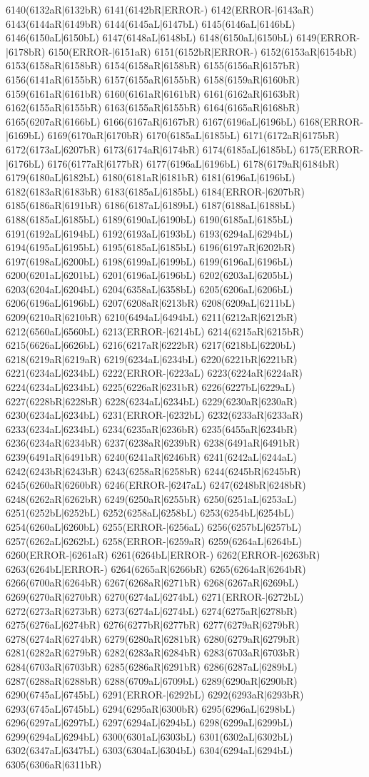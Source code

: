 6140(6132aR|6132bR) 6141(6142bR|ERROR-) 6142(ERROR-|6143aR) 6143(6144aR|6149bR) 6144(6145aL|6147bL) 6145(6146aL|6146bL) 6146(6150aL|6150bL) 6147(6148aL|6148bL) 6148(6150aL|6150bL) 6149(ERROR-|6178bR) 6150(ERROR-|6151aR) 6151(6152bR|ERROR-) 6152(6153aR|6154bR) 6153(6158aR|6158bR) 6154(6158aR|6158bR) 6155(6156aR|6157bR) 6156(6141aR|6155bR) 6157(6155aR|6155bR) 6158(6159aR|6160bR) 6159(6161aR|6161bR) 6160(6161aR|6161bR) 6161(6162aR|6163bR) 6162(6155aR|6155bR) 6163(6155aR|6155bR) 6164(6165aR|6168bR) 6165(6207aR|6166bL) 6166(6167aR|6167bR) 6167(6196aL|6196bL) 6168(ERROR-|6169bL) 6169(6170aR|6170bR) 6170(6185aL|6185bL) 6171(6172aR|6175bR) 6172(6173aL|6207bR) 6173(6174aR|6174bR) 6174(6185aL|6185bL) 6175(ERROR-|6176bL) 6176(6177aR|6177bR) 6177(6196aL|6196bL) 6178(6179aR|6184bR) 6179(6180aL|6182bL) 6180(6181aR|6181bR) 6181(6196aL|6196bL) 6182(6183aR|6183bR) 6183(6185aL|6185bL) 6184(ERROR-|6207bR) 6185(6186aR|6191bR) 6186(6187aL|6189bL) 6187(6188aL|6188bL) 6188(6185aL|6185bL) 6189(6190aL|6190bL) 6190(6185aL|6185bL) 6191(6192aL|6194bL) 6192(6193aL|6193bL) 6193(6294aL|6294bL) 6194(6195aL|6195bL) 6195(6185aL|6185bL) 6196(6197aR|6202bR) 6197(6198aL|6200bL) 6198(6199aL|6199bL) 6199(6196aL|6196bL) 6200(6201aL|6201bL) 6201(6196aL|6196bL) 6202(6203aL|6205bL) 6203(6204aL|6204bL) 6204(6358aL|6358bL) 6205(6206aL|6206bL) 6206(6196aL|6196bL) 6207(6208aR|6213bR) 6208(6209aL|6211bL) 6209(6210aR|6210bR) 6210(6494aL|6494bL) 6211(6212aR|6212bR) 6212(6560aL|6560bL) 6213(ERROR-|6214bL) 6214(6215aR|6215bR) 6215(6626aL|6626bL) 6216(6217aR|6222bR) 6217(6218bL|6220bL) 6218(6219aR|6219aR) 6219(6234aL|6234bL) 6220(6221bR|6221bR) 6221(6234aL|6234bL) 6222(ERROR-|6223aL) 6223(6224aR|6224aR) 6224(6234aL|6234bL) 6225(6226aR|6231bR) 6226(6227bL|6229aL) 6227(6228bR|6228bR) 6228(6234aL|6234bL) 6229(6230aR|6230aR) 6230(6234aL|6234bL) 6231(ERROR-|6232bL) 6232(6233aR|6233aR) 6233(6234aL|6234bL) 6234(6235aR|6236bR) 6235(6455aR|6234bR) 6236(6234aR|6234bR) 6237(6238aR|6239bR) 6238(6491aR|6491bR) 6239(6491aR|6491bR) 6240(6241aR|6246bR) 6241(6242aL|6244aL) 6242(6243bR|6243bR) 6243(6258aR|6258bR) 6244(6245bR|6245bR) 6245(6260aR|6260bR) 6246(ERROR-|6247aL) 6247(6248bR|6248bR) 6248(6262aR|6262bR) 6249(6250aR|6255bR) 6250(6251aL|6253aL) 6251(6252bL|6252bL) 6252(6258aL|6258bL) 6253(6254bL|6254bL) 6254(6260aL|6260bL) 6255(ERROR-|6256aL) 6256(6257bL|6257bL) 6257(6262aL|6262bL) 6258(ERROR-|6259aR) 6259(6264aL|6264bL) 6260(ERROR-|6261aR) 6261(6264bL|ERROR-) 6262(ERROR-|6263bR) 6263(6264bL|ERROR-) 6264(6265aR|6266bR) 6265(6264aR|6264bR) 6266(6700aR|6264bR) 6267(6268aR|6271bR) 6268(6267aR|6269bL) 6269(6270aR|6270bR) 6270(6274aL|6274bL) 6271(ERROR-|6272bL) 6272(6273aR|6273bR) 6273(6274aL|6274bL) 6274(6275aR|6278bR) 6275(6276aL|6274bR) 6276(6277bR|6277bR) 6277(6279aR|6279bR) 6278(6274aR|6274bR) 6279(6280aR|6281bR) 6280(6279aR|6279bR) 6281(6282aR|6279bR) 6282(6283aR|6284bR) 6283(6703aR|6703bR) 6284(6703aR|6703bR) 6285(6286aR|6291bR) 6286(6287aL|6289bL) 6287(6288aR|6288bR) 6288(6709aL|6709bL) 6289(6290aR|6290bR) 6290(6745aL|6745bL) 6291(ERROR-|6292bL) 6292(6293aR|6293bR) 6293(6745aL|6745bL) 6294(6295aR|6300bR) 6295(6296aL|6298bL) 6296(6297aL|6297bL) 6297(6294aL|6294bL) 6298(6299aL|6299bL) 6299(6294aL|6294bL) 6300(6301aL|6303bL) 6301(6302aL|6302bL) 6302(6347aL|6347bL) 6303(6304aL|6304bL) 6304(6294aL|6294bL) 6305(6306aR|6311bR) 